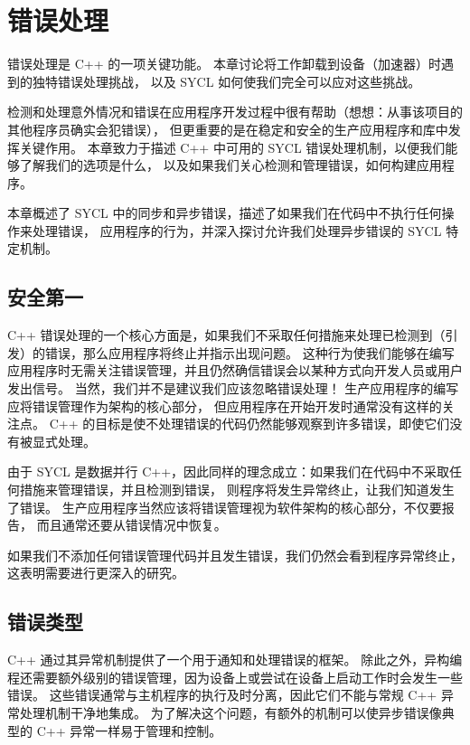 \section{错误处理}
错误处理是 C++ 的一项关键功能。 本章讨论将工作卸载到设备（加速器）时遇到的独特错误处理挑战，
以及 SYCL 如何使我们完全可以应对这些挑战。

检测和处理意外情况和错误在应用程序开发过程中很有帮助（想想：从事该项目的其他程序员确实会犯错误），
但更重要的是在稳定和安全的生产应用程序和库中发挥关键作用。 
本章致力于描述 C++ 中可用的 SYCL 错误处理机制，以便我们能够了解我们的选项是什么，
以及如果我们关心检测和管理错误，如何构建应用程序。

本章概述了 SYCL 中的同步和异步错误，描述了如果我们在代码中不执行任何操作来处理错误，
应用程序的行为，并深入探讨允许我们处理异步错误的 SYCL 特定机制。


\subsection{安全第一}
C++ 错误处理的一个核心方面是，如果我们不采取任何措施来处理已检测到（引发）的错误，那么应用程序将终止并指示出现问题。 
这种行为使我们能够在编写应用程序时无需关注错误管理，并且仍然确信错误会以某种方式向开发人员或用户发出信号。 
当然，我们并不是建议我们应该忽略错误处理！ 生产应用程序的编写应将错误管理作为架构的核心部分，
但应用程序在开始开发时通常没有这样的关注点。 
C++ 的目标是使不处理错误的代码仍然能够观察到许多错误，即使它们没有被显式处理。

由于 SYCL 是数据并行 C++，因此同样的理念成立：如果我们在代码中不采取任何措施来管理错误，并且检测到错误，
则程序将发生异常终止，让我们知道发生了错误。 生产应用程序当然应该将错误管理视为软件架构的核心部分，不仅要报告，
而且通常还要从错误情况中恢复。

\begin{remark}
	如果我们不添加任何错误管理代码并且发生错误，我们仍然会看到程序异常终止，这表明需要进行更深入的研究。
\end{remark}

\subsection{错误类型}
C++ 通过其异常机制提供了一个用于通知和处理错误的框架。 
除此之外，异构编程还需要额外级别的错误管理，因为设备上或尝试在设备上启动工作时会发生一些错误。 
这些错误通常与主机程序的执行及时分离，因此它们不能与常规 C++ 异常处理机制干净地集成。 
为了解决这个问题，有额外的机制可以使异步错误像典型的 C++ 异常一样易于管理和控制。

